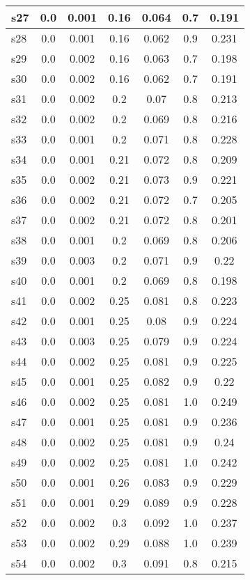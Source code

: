 \documentclass{article}
\begin{document}
\begin{tabular}{|l|c|c|c|c|c|c|}
\hline
s27 &0.0 & 0.001 & 0.16 & 0.064 & 0.7 & 0.191\\
\hline
s28 &0.0 & 0.001 & 0.16 & 0.062 & 0.9 & 0.231\\
\hline
s29 &0.0 & 0.002 & 0.16 & 0.063 & 0.7 & 0.198\\
\hline
s30 &0.0 & 0.002 & 0.16 & 0.062 & 0.7 & 0.191\\
\hline
s31 &0.0 & 0.002 & 0.2 & 0.07 & 0.8 & 0.213\\
\hline
s32 &0.0 & 0.002 & 0.2 & 0.069 & 0.8 & 0.216\\
\hline
s33 &0.0 & 0.001 & 0.2 & 0.071 & 0.8 & 0.228\\
\hline
s34 &0.0 & 0.001 & 0.21 & 0.072 & 0.8 & 0.209\\
\hline
s35 &0.0 & 0.002 & 0.21 & 0.073 & 0.9 & 0.221\\
\hline
s36 &0.0 & 0.002 & 0.21 & 0.072 & 0.7 & 0.205\\
\hline
s37 &0.0 & 0.002 & 0.21 & 0.072 & 0.8 & 0.201\\
\hline
s38 &0.0 & 0.001 & 0.2 & 0.069 & 0.8 & 0.206\\
\hline
s39 &0.0 & 0.003 & 0.2 & 0.071 & 0.9 & 0.22\\
\hline
s40 &0.0 & 0.001 & 0.2 & 0.069 & 0.8 & 0.198\\
\hline
s41 &0.0 & 0.002 & 0.25 & 0.081 & 0.8 & 0.223\\
\hline
s42 &0.0 & 0.001 & 0.25 & 0.08 & 0.9 & 0.224\\
\hline
s43 &0.0 & 0.003 & 0.25 & 0.079 & 0.9 & 0.224\\
\hline
s44 &0.0 & 0.002 & 0.25 & 0.081 & 0.9 & 0.225\\
\hline
s45 &0.0 & 0.001 & 0.25 & 0.082 & 0.9 & 0.22\\
\hline
s46 &0.0 & 0.002 & 0.25 & 0.081 & 1.0 & 0.249\\
\hline
s47 &0.0 & 0.001 & 0.25 & 0.081 & 0.9 & 0.236\\
\hline
s48 &0.0 & 0.002 & 0.25 & 0.081 & 0.9 & 0.24\\
\hline
s49 &0.0 & 0.002 & 0.25 & 0.081 & 1.0 & 0.242\\
\hline
s50 &0.0 & 0.001 & 0.26 & 0.083 & 0.9 & 0.229\\
\hline
s51 &0.0 & 0.001 & 0.29 & 0.089 & 0.9 & 0.228\\
\hline
s52 &0.0 & 0.002 & 0.3 & 0.092 & 1.0 & 0.237\\
\hline
s53 &0.0 & 0.002 & 0.29 & 0.088 & 1.0 & 0.239\\
\hline
s54 &0.0 & 0.002 & 0.3 & 0.091 & 0.8 & 0.215\\

\end{tabular}
\end{document}

